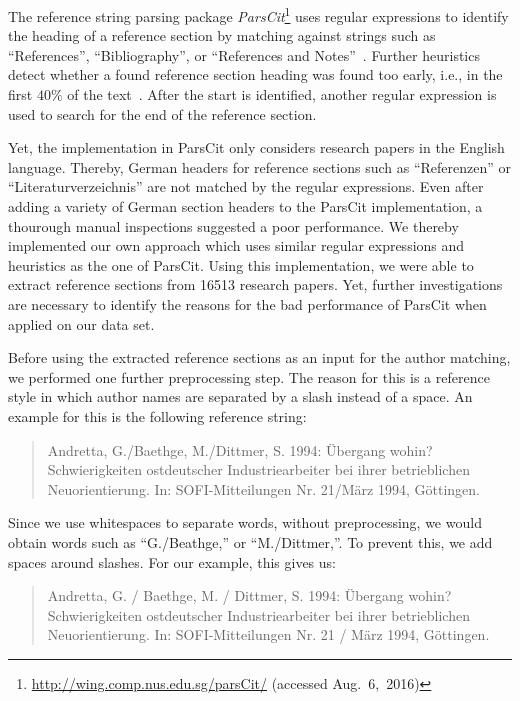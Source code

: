 The reference string parsing package \textit{ParsCit}\footnote{\url{http://wing.comp.nus.edu.sg/parsCit/} (accessed Aug.~6,~2016)} uses regular expressions to identify the heading of a reference section by matching against strings such as ``References'', ``Bibliography'', or ``References and Notes''~\citep{councill2008parscit}.
Further heuristics detect whether a found reference section heading was found too early, i.e., in the first $40\%$ of the text~\citep{councill2008parscit}.
After the start is identified, another regular expression is used to search for the end of the reference section.

Yet, the implementation in ParsCit only considers research papers in the English language.
Thereby, German headers for reference sections such as ``Referenzen'' or ``Literaturverzeichnis'' are not matched by the regular expressions.
Even after adding a variety of German section headers to the ParsCit implementation, a thourough manual inspections suggested a poor performance.
We thereby implemented our own approach which uses similar regular expressions and heuristics as the one of ParsCit.
Using this implementation, we were able to extract reference sections from \num{16513} research papers.
Yet, further investigations are necessary to identify the reasons for the bad performance of ParsCit when applied on our data set.

\bigskip

Before using the extracted reference sections as an input for the author matching, we performed one further preprocessing step.
The reason for this is a reference style in which author names are separated by a slash instead of a space.
An example for this is the following reference string:
\begin{quote}
  Andretta, G./Baethge, M./Dittmer, S. 1994: \"{U}bergang wohin? Schwierigkeiten ostdeutscher Industriearbeiter bei ihrer betrieblichen Neuorientierung. In: SOFI-Mitteilungen Nr. 21/M\"{a}rz 1994, G\"{o}ttingen.
\end{quote}
Since we use whitespaces to separate words, without preprocessing, we would obtain words such as ``G./Beathge,{}'' or ``M./Dittmer,{}''.
To prevent this, we add spaces around slashes.
For our example, this gives us:
\begin{quote}
  Andretta, G. / Baethge, M. / Dittmer, S. 1994: \"{U}bergang wohin? Schwierigkeiten ostdeutscher Industriearbeiter bei ihrer betrieblichen Neuorientierung. In: SOFI-Mitteilungen Nr. 21 / M\"{a}rz 1994, G\"{o}ttingen.
\end{quote}


